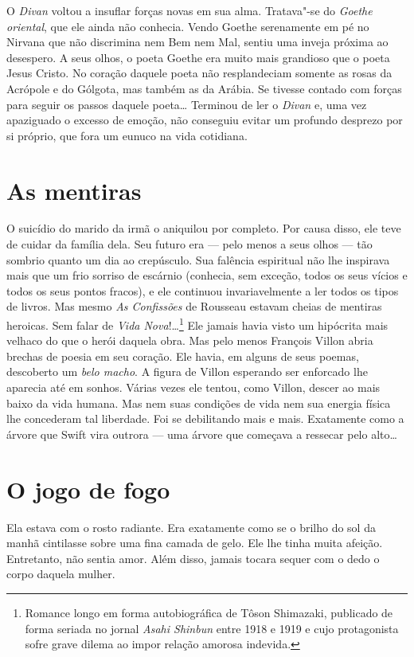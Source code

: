O \textit{Divan} voltou a insuflar forças novas em sua alma. Tratava"-se
do \textit{Goethe oriental}, que ele ainda não conhecia. Vendo Goethe
serenamente em pé no Nirvana que não discrimina nem Bem nem Mal, sentiu
uma inveja próxima ao desespero. A seus olhos, o poeta Goethe era muito
mais grandioso que o poeta Jesus Cristo. No coração daquele poeta não
resplandeciam somente as rosas da Acrópole e do Gólgota, mas também as
da Arábia. Se tivesse contado com forças para seguir os passos daquele
poeta\ldots{} Terminou de ler o \textit{Divan} e, uma vez apaziguado o
excesso de emoção, não conseguiu evitar um profundo desprezo por si
próprio, que fora um eunuco na vida cotidiana.

\section{As mentiras}

O suicídio do marido da irmã o aniquilou por completo. Por causa disso,
ele teve de cuidar da família dela. Seu futuro era --- pelo menos a seus
olhos --- tão sombrio quanto um dia ao crepúsculo. Sua falência
espiritual não lhe inspirava mais que um frio sorriso de escárnio
(conhecia, sem exceção, todos os seus vícios e todos os seus pontos
fracos), e ele continuou invariavelmente a ler todos os tipos de
livros. Mas mesmo \textit{As Confissões} de Rousseau estavam cheias de
mentiras heroicas. Sem falar de \textit{Vida Nova}!\ldots{}\footnote{ Romance
longo em forma autobiográfica de Tôson Shimazaki, publicado de forma
seriada no jornal \textit{Asahi Shinbun} entre 1918 e 1919 e cujo
protagonista sofre grave dilema ao impor relação amorosa indevida.} 
Ele jamais havia visto um hipócrita mais velhaco do que o herói daquela
obra. Mas pelo menos François Villon abria brechas de poesia em seu
coração. Ele havia, em alguns de seus poemas, descoberto um \textit{belo
macho}. A figura de Villon esperando ser enforcado lhe aparecia até em
sonhos. Várias vezes ele tentou, como Villon, descer ao mais baixo da
vida humana. Mas nem suas condições de vida nem sua energia física lhe
concederam tal liberdade. Foi se debilitando mais e mais. Exatamente
como a árvore que Swift vira outrora --- uma árvore que começava a
ressecar pelo alto\ldots{}

\section{O jogo de fogo}

Ela estava com o rosto radiante. Era exatamente como se o brilho do sol
da manhã cintilasse sobre uma fina camada de gelo. Ele lhe tinha muita
afeição. Entretanto, não sentia amor. Além disso, jamais tocara sequer
com o dedo o corpo daquela mulher.

